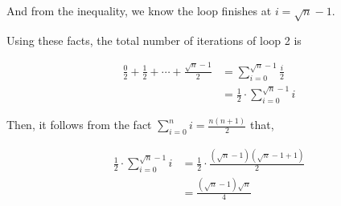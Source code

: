 \documentclass[12pt]{article}
\begin{document}
\begin{enumerate}[a.]
\begin{mdframed}
        \bigskip

        And from the inequality, we know the loop finishes at $i = \sqrt{n} - 1$.
        \color{black}

        \bigskip

        Using \color{red}these facts\color{black}, the total number of iterations of loop 2 is

        \color{red}
        \begin{align}
            \frac{0}{2} + \frac{1}{2} + \cdots + \frac{\sqrt{n} - 1}{2} &= \sum\limits_{i=0}^{\sqrt{n} - 1} \frac{i}{2}\\
            &= \frac{1}{2} \cdot \sum\limits_{i=0}^{\sqrt{n} - 1} i
        \end{align}

        \bigskip

        Then, it follows from the fact $\sum\limits_{i=0}^n i = \frac{n(n+1)}{2}$ that,

        \begin{align}
            \frac{1}{2} \cdot \sum\limits_{i=0}^{\sqrt{n}-1} i &= \frac{1}{2} \cdot \frac{(\sqrt{n}-1)(\sqrt{n}-1+1)}{2}\\
            &= \frac{(\sqrt{n}-1)\sqrt{n}}{4}
        \end{align}
        \color{black}

    \end{mdframed}

\end{enumerate}
\end{document}
